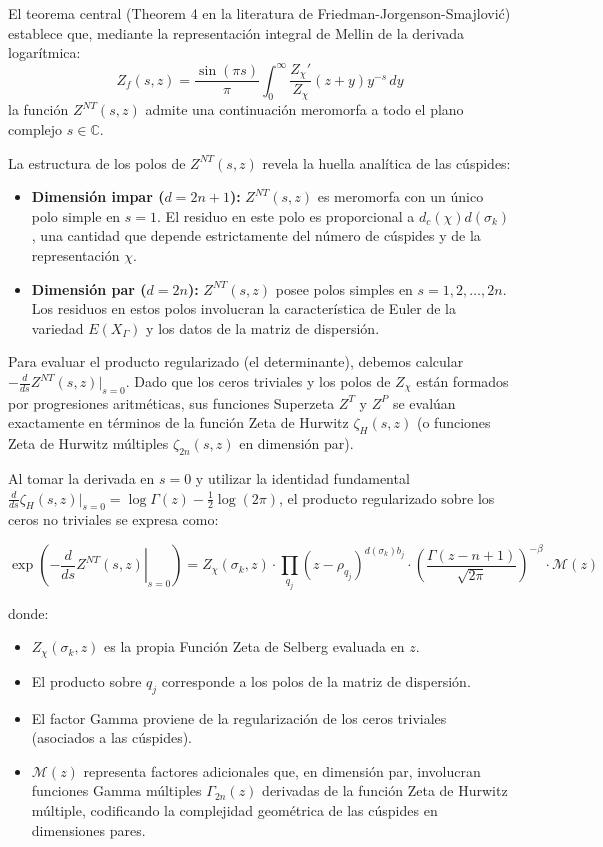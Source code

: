 El teorema central (Theorem 4 en la literatura de Friedman-Jorgenson-Smajlović) establece que, mediante la representación integral de Mellin de la derivada logarítmica:
$$ Z_f(s, z) = \frac{\sin(\pi s)}{\pi} \int_0^{\infty} \frac{Z_\chi'}{Z_\chi}(z+y) y^{-s} \, dy $$
la función $Z^{NT}(s, z)$ admite una continuación meromorfa a todo el plano complejo $s \in \mathbb{C}$. 

La estructura de los polos de $Z^{NT}(s, z)$ revela la huella analítica de las cúspides:
\begin{itemize}
    \item \textbf{Dimensión impar ($d = 2n+1$):} $Z^{NT}(s, z)$ es meromorfa con un único polo simple en $s=1$. El residuo en este polo es proporcional a $d_c(\chi)d(\sigma_k)$, una cantidad que depende estrictamente del número de cúspides y de la representación $\chi$.
    \item \textbf{Dimensión par ($d = 2n$):} $Z^{NT}(s, z)$ posee polos simples en $s = 1, 2, \dots, 2n$. Los residuos en estos polos involucran la característica de Euler de la variedad $E(X_\Gamma)$ y los datos de la matriz de dispersión.
\end{itemize}

Para evaluar el producto regularizado (el determinante), debemos calcular $-\frac{d}{ds} Z^{NT}(s, z) \big|_{s=0}$. Dado que los ceros triviales y los polos de $Z_\chi$ están formados por progresiones aritméticas, sus funciones Superzeta $Z^T$ y $Z^P$ se evalúan exactamente en términos de la función Zeta de Hurwitz $\zeta_H(s, z)$ (o funciones Zeta de Hurwitz múltiples $\zeta_{2n}(s, z)$ en dimensión par).

Al tomar la derivada en $s=0$ y utilizar la identidad fundamental $\frac{d}{ds}\zeta_H(s, z)\big|_{s=0} = \log \Gamma(z) - \frac{1}{2}\log(2\pi)$, el producto regularizado sobre los ceros no triviales se expresa como:

$$ \exp\left( -\left. \frac{d}{ds} Z^{NT}(s, z) \right|_{s=0} \right) = Z_\chi(\sigma_k, z) \cdot \prod_{q_j} (z - \rho_{q_j})^{d(\sigma_k)b_j} \cdot \left( \frac{\Gamma(z - n + 1)}{\sqrt{2\pi}} \right)^{-\beta} \cdot \mathcal{M}(z) $$

donde:
\begin{itemize}
    \item $Z_\chi(\sigma_k, z)$ es la propia Función Zeta de Selberg evaluada en $z$.
    \item El producto sobre $q_j$ corresponde a los polos de la matriz de dispersión.
    \item El factor Gamma proviene de la regularización de los ceros triviales (asociados a las cúspides).
    \item $\mathcal{M}(z)$ representa factores adicionales que, en dimensión par, involucran funciones Gamma múltiples $\Gamma_{2n}(z)$ derivadas de la función Zeta de Hurwitz múltiple, codificando la complejidad geométrica de las cúspides en dimensiones pares.
\end{itemize}

